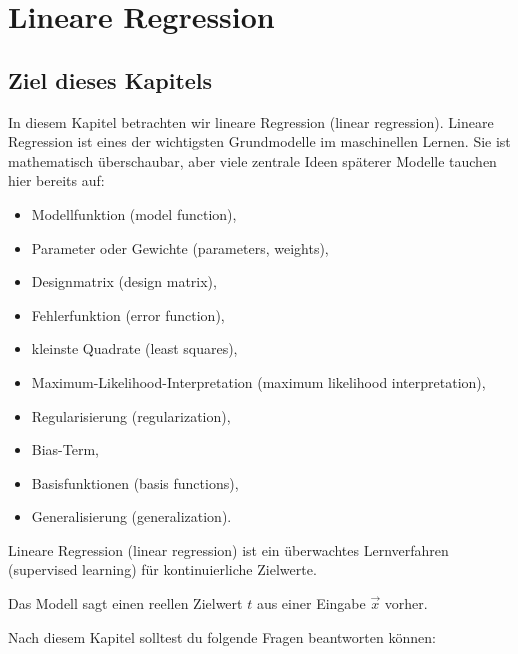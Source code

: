 \chapter{Lineare Regression}

\section{Ziel dieses Kapitels}

In diesem Kapitel betrachten wir lineare Regression (linear regression).
Lineare Regression ist eines der wichtigsten Grundmodelle im maschinellen Lernen.
Sie ist mathematisch überschaubar, aber viele zentrale Ideen späterer Modelle tauchen hier bereits auf:

\begin{itemize}
    \item Modellfunktion (model function),
    \item Parameter oder Gewichte (parameters, weights),
    \item Designmatrix (design matrix),
    \item Fehlerfunktion (error function),
    \item kleinste Quadrate (least squares),
    \item Maximum-Likelihood-Interpretation (maximum likelihood interpretation),
    \item Regularisierung (regularization),
    \item Bias-Term,
    \item Basisfunktionen (basis functions),
    \item Generalisierung (generalization).
\end{itemize}

\begin{conceptbox}
Lineare Regression (linear regression) ist ein überwachtes Lernverfahren (supervised learning) für kontinuierliche Zielwerte.

Das Modell sagt einen reellen Zielwert \(t\) aus einer Eingabe \(\vec{x}\) vorher.
\end{conceptbox}

Nach diesem Kapitel solltest du folgende Fragen beantworten können:

